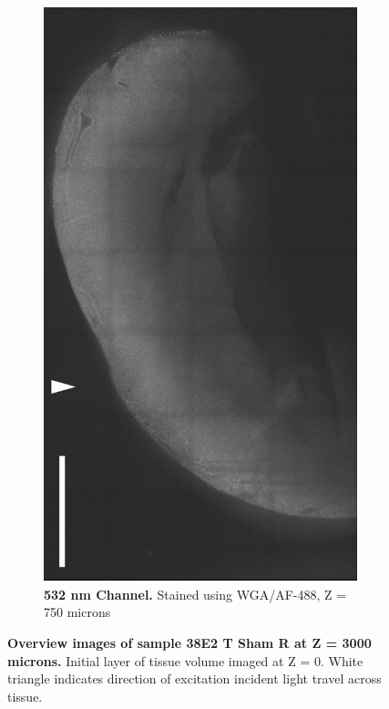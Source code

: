 \begin{figure}[H]
\begin{subfigure}[t]{0.48\textwidth}
        \includegraphics[width=1\linewidth]{Images/T_Sham_R_Figure_Draft_532_2.png}
        \caption{\textbf{532 nm Channel.} Stained using WGA/AF-488, Z = 750 microns}
    \end{subfigure}    
    
\caption{\textbf{Overview images of sample 38E2 T Sham R at Z = 3000 microns.} Initial layer of tissue volume imaged at Z = 0. White triangle indicates direction of excitation incident light travel across tissue.}  
\label{fig:enter-label}
\end{figure}


